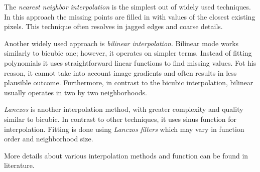 The \textit{nearest neighbor interpolation} is the simplest out of widely used techniques.
In this approach the missing points are filled in with values of the closest existing pixels.
This technique often resolves in jagged edges and coarse details.

Another widely used approach is \textit{bilinear interpolation}.
Bilinear mode works similarly to bicubic one; however, it operates on simpler terms.
Instead of fitting polynomials it uses straightforward linear functions to find missing values.
Fot his reason, it cannot take into account image gradients and often results in less plausible outcome.
Furthermore, in contrast to the bicubic interpolation, bilinear usually operates in two by two neighborhoods.

\textit{Lanczos} is another interpolation method, with greater complexity and quality similar to bicubic.
In contrast to other techniques, it uses sinus function for interpolation.
Fitting is done using \textit{Lanczos filters} which may vary in function order and neighborhood size.

More details about various interpolation methods and function can be found in literature.


